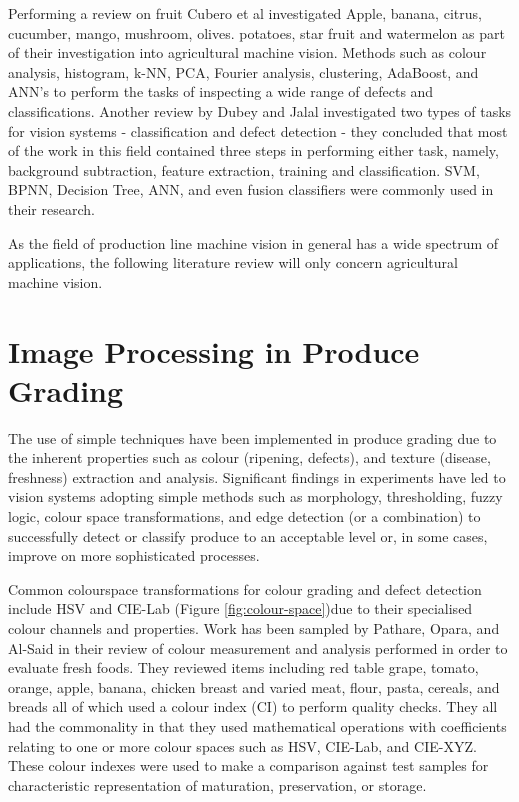 \documentclass[fleqn,twoside,12pt]{report}
\begin{document}
Performing a review on fruit Cubero et al \cite{cubero} investigated Apple, banana, citrus, cucumber, mango, mushroom, olives. potatoes, star fruit and watermelon as part of their investigation into agricultural machine vision. Methods such as colour analysis, histogram, k-NN, PCA, Fourier analysis, clustering, AdaBoost, and ANN's to perform the tasks of inspecting a wide range of defects and classifications. Another review by Dubey and Jalal \cite{dubey} investigated two types of tasks for vision systems - classification and defect detection - they concluded that most of the work in this field contained three steps in performing either task, namely, background subtraction, feature extraction, training and classification. SVM, BPNN, Decision Tree, ANN, and even fusion classifiers were commonly used in their research.

As the field of production line machine vision in general has a wide spectrum of applications, the following literature review will only concern agricultural machine vision. 


\section{Image Processing in Produce Grading}

 
The use of simple techniques have been implemented in produce grading due to the inherent properties such as colour (ripening, defects), and texture (disease, freshness) extraction and analysis. Significant findings in experiments have led to vision systems adopting simple methods such as morphology, thresholding, fuzzy logic, colour space transformations, and edge detection (or a combination) to successfully detect or classify produce to an acceptable level or, in some cases, improve on more sophisticated processes.

Common colourspace transformations for colour grading and defect detection include HSV and CIE-Lab (Figure \ref{fig:colour-space})due to their specialised colour channels and properties. Work has been sampled by Pathare, Opara, and Al-Said \cite{pathare} in their review of colour measurement and analysis performed in order to evaluate fresh foods. They reviewed items including red table grape, tomato, orange, apple, banana, chicken breast and varied meat, flour, pasta, cereals, and breads all of which used a colour index (CI) to perform quality checks. They all had the commonality in that they used mathematical operations with coefficients relating to one or more colour spaces such as HSV, CIE-Lab, and CIE-XYZ. These colour indexes were used to make a comparison against test samples for characteristic representation of maturation, preservation, or storage. 
\end{document}
